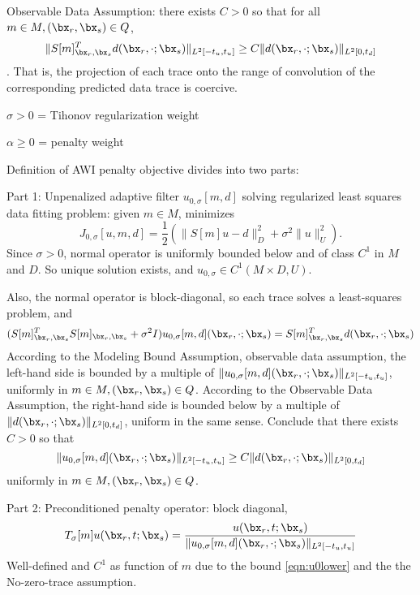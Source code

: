 Observable Data Assumption: there exists $C>0$ so that for all $m \in M, (\bx_r,\bx_s) \in Q$,
\begin{equation}
  \label{eqn:obsdata}
  \|S[m]_{\bx_r,\bx_s}^Td(\bx_r,\cdot;\bx_s)\|_{L^2[-t_u,t_u]} \ge C \|d(\bx_r,\cdot;\bx_s)\|_{L^2[0,t_d]}
\end{equation}.
That is, the projection of each trace onto the range of convolution of the corresponding predicted data trace is coercive.  

$\sigma > 0$ = Tihonov regularization weight

$\alpha \ge 0$ = penalty weight

Definition of AWI penalty objective divides into two parts:

Part 1: Unpenalized adaptive filter $u_{0,\sigma}[m,d]$ solving regularized least squares data fitting problem:  given $m \in M$, minimizes
\[
 J_{0,\sigma}[u,m,d] = \frac{1}{2}(\|S[m]u - d\|_D^2 + \sigma^2 \|u\|^2_U).
\]
Since $\sigma > 0$, normal operator is uniformly bounded below and of class $C^1$ in $M$ and $D$. So unique solution exists, and $u_{0,\sigma} \in C^1(M \times D, U)$.

Also, the normal operator is block-diagonal, so each trace solves a least-squares problem, and
\[
  (S[m]_{\bx_r,\bx_s}^TS[m]_{\bx_r,\bx_s} + \sigma^2 I)u_{0,\sigma}[m,d](\bx_r,\cdot; \bx_s)= S[m]_{\bx_r,\bx_s}^Td(\bx_r,\cdot;\bx_s)
\]
According to the Modeling Bound Assumption, observable data assumption, the left-hand side is bounded by a multiple of $\|u_{0,\sigma}[m,d](\bx_r,\cdot; \bx_s)\|_{L^2[-t_u,t_u]}$, uniformly in $m \in M, (\bx_r,\bx_s) \in Q$. According to the Observable Data Assumption, the right-hand side is bounded below by a multiple of $\|d(\bx_r,\cdot;\bx_s)\|_{L^2[0,t_d]}$, uniform in the same sense. Conclude that there exists $C>0$ so that
\begin{equation}
  \label{eqn:u0lower}
  \|u_{0,\sigma}[m,d](\bx_r,\cdot; \bx_s)\|_{L^2[-t_u,t_u]} \ge C \|d(\bx_r,\cdot;\bx_s)\|_{L^2[0,t_d]}
\end{equation}
uniformly in $m \in M, (\bx_r,\bx_s) \in Q$.

Part 2:
Preconditioned penalty operator: block diagonal, 
\begin{equation}
  \label{eqn:ppf}
  T_{\sigma}[m]u (\bx_r,t;\bx_s) = \frac{u(\bx_r,t;\bx_s)}{\|u_{0,\sigma}[m,d](\bx_r,\cdot; \bx_s)\|_{L^2[-t_u,t_u]} }
\end{equation}
Well-defined and $C^1$ as function of $m$ due to the bound \ref{eqn:u0lower} and the the No-zero-trace assumption.

